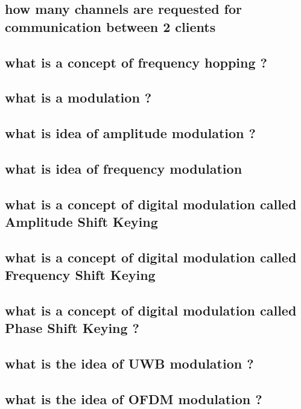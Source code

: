 \subsection{how many channels are requested for communication between 2 clients}



\subsection{what is a concept of frequency hopping ?}



\subsection{what is a modulation ?}



\subsection{what is idea of amplitude modulation ?}



\subsection{what is idea of frequency modulation}

\subsection{what is a concept of digital modulation called Amplitude Shift Keying}



\subsection{what is a concept of digital modulation called Frequency Shift Keying}



\subsection{what is a concept of digital modulation called Phase Shift Keying ?}



\subsection{what is the idea of UWB modulation ?}



\subsection{what is the idea of OFDM modulation ?}

